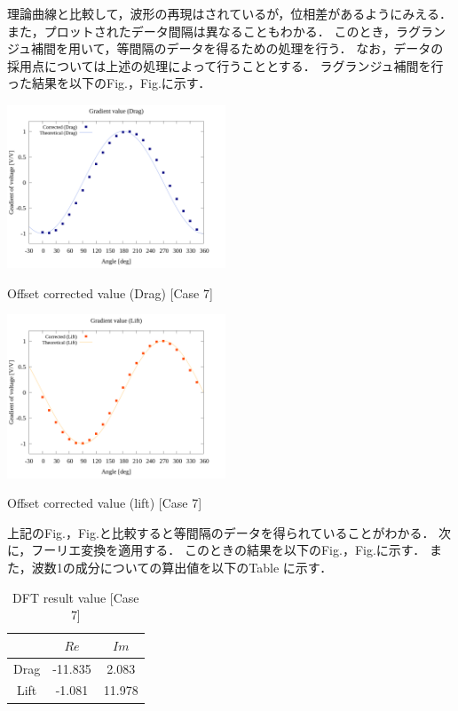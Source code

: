理論曲線と比較して，波形の再現はされているが，位相差があるようにみえる．
また，プロットされたデータ間隔は異なることもわかる．
このとき，ラグランジュ補間を用いて，等間隔のデータを得るための処理を行う．
なお，データの採用点については上述の処理によって行うこととする．
ラグランジュ補間を行った結果を以下のFig.，Fig.に示す．

\begin{multicols}{2}
    \begin{figure_here}
        \begin{center}
            \includegraphics[width=65mm]{../../02_workspace/result/simulation_tx=10.0_ty=-5.0_dx=5.00_dy=-2.50/plot/21/21-3_interpolated_drag.png}
            \caption{Offset corrected value (Drag) [Case 7]}
            \includegraphics[width=65mm]{../../02_workspace/result/simulation_tx=10.0_ty=-5.0_dx=5.00_dy=-2.50/plot/21/21-3_interpolated_lift.png}
            \caption{Offset corrected value (lift) [Case 7]}
        \end{center}
    \end{figure_here}
\end{multicols}

上記のFig.，Fig.と比較すると等間隔のデータを得られていることがわかる．
次に，フーリエ変換を適用する．
このときの結果を以下のFig.，Fig.に示す．
また，波数1の成分についての算出値を以下のTable に示す．

\begin{table}[htbp]
    \begin{center}
        \caption{DFT result value [Case 7]}
        \begin{tabular}{|p{30mm}|p{20mm}|p{20mm}|}
            \hline
            \multicolumn{1}{|c|}{}     & \multicolumn{1}{|c|}{$Re$}    & \multicolumn{1}{|c|}{$Im$}   \\ \hline
            \multicolumn{1}{|c|}{Drag} & \multicolumn{1}{|c|}{-11.835} & \multicolumn{1}{|c|}{2.083}  \\ \hline
            \multicolumn{1}{|c|}{Lift} & \multicolumn{1}{|c|}{-1.081}  & \multicolumn{1}{|c|}{11.978} \\ \hline
        \end{tabular}
    \end{center}
\end{table}

